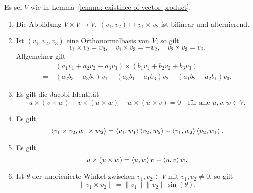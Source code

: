 \begin{theorem}
  Es sei $V$ wie in Lemma~\ref{lemma: existince of vector product}.
  \begin{enumerate}[leftmargin=*, label=\roman*)]
    \item
      Die Abbildung $V \times V \to V$, $(v_1, v_2) \mapsto v_1 \times v_2$ ist bilinear und alternierend.
    \item
      Ist $(v_1, v_2, v_3)$ eine Orthonormalbasis von $V$, so gilt
      \[
        v_1 \times v_2 =  v_3,
        \quad
        v_1 \times v_3 = -v_2,
        \quad
        v_2 \times v_3 = v_3.
      \]
      Allgemeiner gilt
      \begin{align*}
         &\,  (a_1 v_1 + a_2 v_2 + a_3 v_3) \times (b_1 v_1 + b_2 v_2 + b_3 v_3)          \\
        =&\,  (a_2 b_3 - a_3 b_2) v_1 + (a_3 b_1 - a_1 b_3) v_2 + (a_1 b_2 - a_2 b_1) v_3.
      \end{align*}
    \item
      Es gilt die Jacobi-Identität
      \[
        u \times (v \times w) + v \times (u \times w) + w \times (u \times v) = 0
        \quad
        \text{für alle $u, v, w \in V$}.
      \]
    \item
      Es gilt
      \[
          \left\langle v_1 \times v_2, w_1 \times w_2 \right\rangle
        = \left\langle v_1, w_1 \right\rangle \left\langle v_2, w_2 \right\rangle - \left\langle v_1, w_2 \right\rangle \left\langle v_2, w_1 \right\rangle.
      \]
    \item
      Es gilt
      \[
          u \times (v \times w)
        = \left\langle u, w \right\rangle v - \left\langle u, v \right\rangle w.
      \]
    \item
      Ist $\theta$ der unorienierte Winkel zwischen $v_1, v_2 \in V$ mit $v_1, v_2 \neq 0$, so gilt
      \[
        \|v_1 \times v_2\| = \|v_1\| \|v_2\| \sin(\theta).
      \]
  \end{enumerate}
\end{theorem}


























